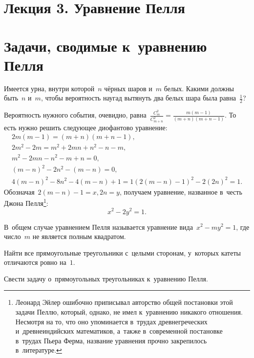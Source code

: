 \documentclass{article}
\begin{document}
\section*{Лекция 3. Уравнение Пелля}
\resetcntrs

\section{Задачи, сводимые к~уравнению Пелля}

\begin{problem}
  Имеется урна, внутри которой~$n$ чёрных шаров и~$m$ белых. Какими должны
  быть~$n$ и~$m$, чтобы вероятность наугад вытянуть два белых шара была
  равна~$\frac{1}{2}$?
\end{problem}

Вероятность нужного события, очевидно, равна~$\frac{C_m^2}{C_{m + n}^2} =
\frac{m(m - 1)}{(m + n)(m + n - 1)}$. То есть нужно решить следующее диофантово
уравнение:
\begin{gather*}
  2m(m - 1) = (m + n)(m + n - 1),\\
  2m^2 - 2m = m^2 + 2mn + n^2 - n - m,\\
  m^2 - 2mn - n^2 - m + n = 0,\\
  (m - n)^2 - 2n^2 - (m - n) = 0,\\
  4(m - n)^2 - 8n^2 - 4(m - n) + 1 = 1
  (2(m - n) - 1)^2 - 2(2n)^2 = 1.
\end{gather*}
Обозначая~$2(m - n) - 1 = x, 2n = y$, получаем уравнение, названное в~честь
Джона Пелля\footnote{Леонард Эйлер ошибочно приписывал авторство общей
постановки этой задачи Пеллю, который, однако, не имел к~уравнению никакого
отношения. Несмотря на то, что оно упоминается в~трудах древнегреческих
и~древнеиндийских математиков, а~также в~современной постановке в~трудах Пьера
Ферма, название уравнения прочно закрепилось в~литературе.}:
$$ x^2 - 2y^2 = 1.$$

В~общем случае уравнением Пелля называется уравнение вида~$x^2 - my^2 = 1$, где
число~$m$ не является полным квадратом.

\begin{problem}
  Найти все прямоугольные треугольники с~целыми сторонам, у~которых катеты
  отличаются ровно на~$1$.
\end{problem}

\begin{exercise}
  Свести задачу о~прямоугольных треугольниках к~уравнению Пелля.
\end{exercise}
\end{document}
